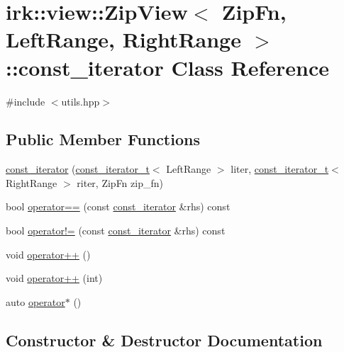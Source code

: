 \hypertarget{classirk_1_1view_1_1ZipView_1_1const__iterator}{}\section{irk\+:\+:view\+:\+:Zip\+View$<$ Zip\+Fn, Left\+Range, Right\+Range $>$\+:\+:const\+\_\+iterator Class Reference}
\label{classirk_1_1view_1_1ZipView_1_1const__iterator}


{\ttfamily \#include $<$utils.\+hpp$>$}

\subsection*{Public Member Functions}
\begin{DoxyCompactItemize}
\item 
\mbox{\hyperlink{classirk_1_1view_1_1ZipView_1_1const__iterator_a609776c989ec542de0baf29c2c413b6d}{const\+\_\+iterator}} (\mbox{\hyperlink{namespaceirk_a90f7893fdbf95c6dcc2302148eb0bddb}{const\+\_\+iterator\+\_\+t}}$<$ Left\+Range $>$ liter, \mbox{\hyperlink{namespaceirk_a90f7893fdbf95c6dcc2302148eb0bddb}{const\+\_\+iterator\+\_\+t}}$<$ Right\+Range $>$ riter, Zip\+Fn zip\+\_\+fn)
\item 
bool \mbox{\hyperlink{classirk_1_1view_1_1ZipView_1_1const__iterator_a1ae00d4c143e3a594c228aedc41b322a}{operator==}} (const \mbox{\hyperlink{classirk_1_1view_1_1ZipView_1_1const__iterator}{const\+\_\+iterator}} \&rhs) const
\item 
bool \mbox{\hyperlink{classirk_1_1view_1_1ZipView_1_1const__iterator_acfba3a3b55f15c9485ae1f84d900d579}{operator!=}} (const \mbox{\hyperlink{classirk_1_1view_1_1ZipView_1_1const__iterator}{const\+\_\+iterator}} \&rhs) const
\item 
void \mbox{\hyperlink{classirk_1_1view_1_1ZipView_1_1const__iterator_a924c85dc6681afea47f98bcbf2f49c47}{operator++}} ()
\item 
void \mbox{\hyperlink{classirk_1_1view_1_1ZipView_1_1const__iterator_a7242e63b9c852a5f9947876965930a56}{operator++}} (int)
\item 
auto \mbox{\hyperlink{classirk_1_1view_1_1ZipView_1_1const__iterator_ac95ceb30ed54868d908b786008b60610}{operator$\ast$}} ()
\end{DoxyCompactItemize}


\subsection{Constructor \& Destructor Documentation}
\mbox{\label{classirk_1_1view_1_1ZipView_1_1const__iterator_a609776c989ec542de0baf29c2c413b6d}} 
